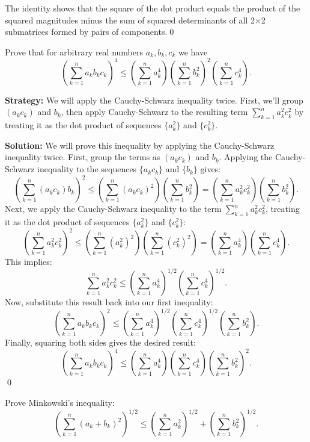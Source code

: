 The identity shows that the square of the dot product equals the product of the squared magnitudes minus the sum of squared determinants of all 2×2 submatrices formed by pairs of components.\qed


\begin{problembox}
\begin{problemstatement}
Prove that for arbitrary real numbers \( a_k, b_k, c_k \) we have
\[
\left( \sum_{k=1}^n a_k b_k c_k \right)^4 \leq
\left( \sum_{k=1}^n a_k^4 \right)
\left( \sum_{k=1}^n b_k^2 \right)^2
\left( \sum_{k=1}^n c_k^4 \right).
\]
\end{problemstatement}
\end{problembox}

\noindent\textbf{Strategy:} We will apply the Cauchy-Schwarz inequality twice. First, we'll group $(a_k c_k)$ and $b_k$, then apply Cauchy-Schwarz to the resulting term $\sum_{k=1}^n a_k^2 c_k^2$ by treating it as the dot product of sequences $\{a_k^2\}$ and $\{c_k^2\}$.

\bigskip\noindent\textbf{Solution:}
We will prove this inequality by applying the Cauchy-Schwarz inequality twice.
First, group the terms as $(a_k c_k)$ and $b_k$. Applying the Cauchy-Schwarz inequality to the sequences $\{a_k c_k\}$ and $\{b_k\}$ gives:
\[
\left( \sum_{k=1}^n (a_k c_k) b_k \right)^2 \leq \left( \sum_{k=1}^n (a_k c_k)^2 \right) \left( \sum_{k=1}^n b_k^2 \right) = \left( \sum_{k=1}^n a_k^2 c_k^2 \right) \left( \sum_{k=1}^n b_k^2 \right).
\]
Next, we apply the Cauchy-Schwarz inequality to the term $\sum_{k=1}^n a_k^2 c_k^2$, treating it as the dot product of sequences $\{a_k^2\}$ and $\{c_k^2\}$:
\[
\left( \sum_{k=1}^n a_k^2 c_k^2 \right)^2 \leq \left( \sum_{k=1}^n (a_k^2)^2 \right) \left( \sum_{k=1}^n (c_k^2)^2 \right) = \left( \sum_{k=1}^n a_k^4 \right) \left( \sum_{k=1}^n c_k^4 \right).
\]
This implies:
\[
\sum_{k=1}^n a_k^2 c_k^2 \leq \left( \sum_{k=1}^n a_k^4 \right)^{1/2} \left( \sum_{k=1}^n c_k^4 \right)^{1/2}.
\]
Now, substitute this result back into our first inequality:
\[
\left( \sum_{k=1}^n a_k b_k c_k \right)^2 \leq \left( \sum_{k=1}^n a_k^4 \right)^{1/2} \left( \sum_{k=1}^n c_k^4 \right)^{1/2} \left( \sum_{k=1}^n b_k^2 \right).
\]
Finally, squaring both sides gives the desired result:
\[
\left( \sum_{k=1}^n a_k b_k c_k \right)^4 \leq \left( \sum_{k=1}^n a_k^4 \right) \left( \sum_{k=1}^n c_k^4 \right) \left( \sum_{k=1}^n b_k^2 \right)^2.
\]\qed


\begin{problembox}
\begin{problemstatement}
Prove Minkowski's inequality:
\[
\left( \sum_{k=1}^n (a_k + b_k)^2 \right)^{1/2} \leq \left( \sum_{k=1}^n a_k^2 \right)^{1/2} + \left( \sum_{k=1}^n b_k^2 \right)^{1/2}.
\]
\end{problemstatement}
\end{problembox}

